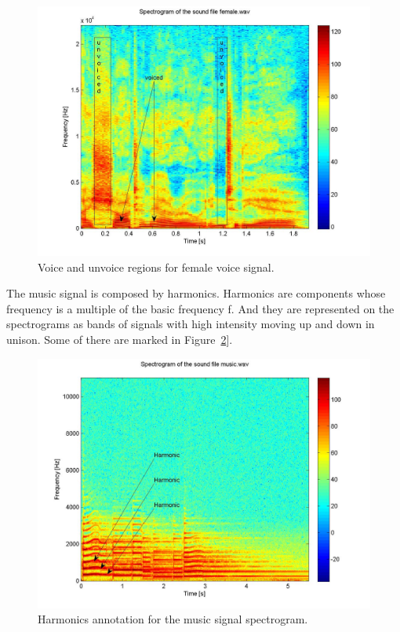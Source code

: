 \documentclass[a4paper]{article}
\begin{document}
\begin{itemize}
\begin{itemize}
			\begin{figure}[!ht]
			\centering
			\includegraphics[width=0.85\columnwidth]{figures/2_3.jpg}
			\caption{Voice and unvoice regions for female voice signal.}
			\label{fig:female_voice_unvoice}
			\end{figure}

			The music signal is composed by harmonics. Harmonics are components whose frequency is a multiple of the basic
			frequency f. And they are represented on the spectrograms as bands of signals with high intensity moving up and
			down in unison. Some of there are marked in Figure~\ref{fig:music_harmonics}].

			\begin{figure}[!ht]
			\centering
			\includegraphics[width=0.85\columnwidth]{figures/2_4.jpg}
			\caption{Harmonics annotation for the music signal spectrogram.}
			\label{fig:music_harmonics}
			\end{figure}


\end{itemize}
\end{itemize}
\end{document}
